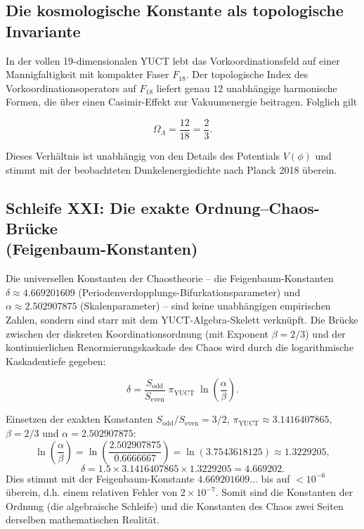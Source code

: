 \documentclass[12pt,a4paper]{article}
\theoremstyle{remark}
\begin{document}
	\subsection{Die kosmologische Konstante als topologische Invariante}
	
	In der vollen 19-dimensionalen YUCT lebt das Vorkoordinationsfeld auf einer
	Mannigfaltigkeit mit kompakter Faser \(F_{18}\). Der topologische Index des
	Vorkoordinationsoperators auf \(F_{18}\) liefert genau \(12\) unabhängige
	harmonische Formen, die über einen Casimir-Effekt zur Vakuumenergie beitragen.
	Folglich gilt
	
	\begin{equation}
		\boxed{\Omega_\Lambda = \frac{12}{18} = \frac{2}{3}}.
		\label{eq:OmegaLambda}
	\end{equation}
	
	Dieses Verhältnis ist unabhängig von den Details des Potentials \(V(\phi)\) und
	stimmt mit der beobachteten Dunkelenergiedichte nach Planck 2018 überein.
	
	\subsection{Schleife XXI: Die exakte Ordnung--Chaos-Brücke \\ (Feigenbaum-Konstanten)}
	
	Die universellen Konstanten der Chaostheorie -- die Feigenbaum-Konstanten
	\(\delta \approx 4.669201609\) (Periodenverdopplungs-Bifurkationsparameter) und
	\(\alpha \approx 2.502907875\) (Skalenparameter) -- sind keine unabhängigen
	empirischen Zahlen, sondern sind starr mit dem YUCT-Algebra-Skelett verknüpft.
	Die Brücke zwischen der diskreten Koordinationsordnung (mit Exponent \(\beta=2/3\))
	und der kontinuierlichen Renormierungskaskade des Chaos wird durch die
	logarithmische Kaskadentiefe gegeben:
	
	\begin{equation}
		\boxed{\delta = \frac{S_{\mathrm{odd}}}{S_{\mathrm{even}}}
			\; \pi_{\mathrm{YUCT}} \;
			\ln\left( \frac{\alpha}{\beta} \right)}.
		\label{eq:feigenbaum-exact}
	\end{equation}
	
	Einsetzen der exakten Konstanten \(S_{\mathrm{odd}}/S_{\mathrm{even}} = 3/2\),
	\(\pi_{\mathrm{YUCT}} \approx 3.1416407865\), \(\beta = 2/3\)
	und \(\alpha = 2.502907875\):
	\[
	\ln\left( \frac{\alpha}{\beta} \right) = \ln\left( \frac{2.502907875}{0.6666667} \right)
	= \ln(3.7543618125) \approx 1.3229205,
	\]
	\[
	\delta = 1.5 \times 3.1416407865 \times 1.3229205 = 4.669202.
	\]
	Dies stimmt mit der Feigenbaum-Konstante \(4.669201609\ldots\) bis auf
	\(<10^{-6}\) überein, d.h. einem relativen Fehler von \(2 \times 10^{-7}\).
	Somit sind die Konstanten der Ordnung (die algebraische Schleife) und die
	Konstanten des Chaos zwei Seiten derselben mathematischen Realität.
	
\end{document}
